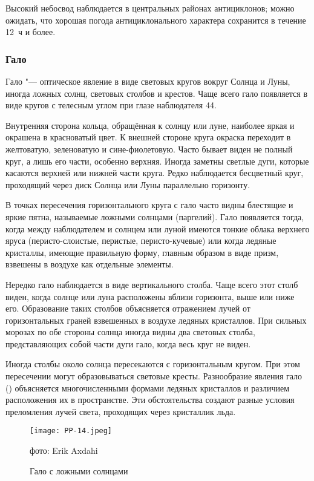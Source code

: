  Высокий небосвод наблюдается в центральных районах
антициклонов; можно ожидать, что хорошая погода антициклонального
характера сохранится в течение 12~ч и более.

\subsubsection{Гало}

Гало "--- оптическое явление в виде световых кругов вокруг Солнца и
Луны, иногда ложных солнц, световых столбов и крестов. Чаще всего гало
появляется в виде кругов с телесным углом при глазе наблюдателя 44\gr.

Внутренняя сторона кольца, обращённая к солнцу или луне, наиболее
яркая и окрашена в красноватый цвет. К внешней стороне круга окраска
переходит в желтоватую, зеленоватую и сине-фиолетовую. Часто бывает
виден не полный круг, а лишь его части, особенно верхняя. Иногда
заметны светлые дуги, которые касаются верхней или нижней части
круга. Редко наблюдается бесцветный круг, проходящий через диск Солнца
или Луны параллельно горизонту.

В точках пересечения горизонтального круга с гало часто видны
блестящие и яркие пятна, называемые ложными солнцами (паргелий). Гало
появляется тогда, когда между наблюдателем и солнцем или луной имеются
тонкие облака верхнего яруса (перисто-слоистые, перистые,
перисто-кучевые) или когда ледяные кристаллы, имеющие правильную
форму, главным образом в виде призм, взвешены в воздухе как отдельные
элементы.

Нередко гало наблюдается в виде вертикального столба. Чаще всего этот
столб виден, когда солнце или луна расположены вблизи горизонта, выше
или ниже его. Образование таких столбов объясняется отражением лучей
от горизонтальных граней взвешенных в воздухе ледяных кристаллов. При
сильных морозах по обе стороны солнца иногда видны два световых
столба, представляющих собой части дуги гало, когда весь круг не
виден.

Иногда столбы около солнца пересекаются с горизонтальным кругом. При
этом пересечении могут образовываться световые кресты. Разнообразие
явления гало () объясняется многочисленными формами ледяных
кристаллов и различием расположения их в пространстве. Эти
обстоятельства создают разные условия преломления лучей света,
проходящих через кристаллик льда.

\begin{figure}[htb]
  \centering{}
  \texttt{[image: PP-14.jpeg]}
  \caption{Гало с ложными солнцами}
  \label{fig:pp14}
  \small
  \centering{}фото: Erik Axdahi
\end{figure}

